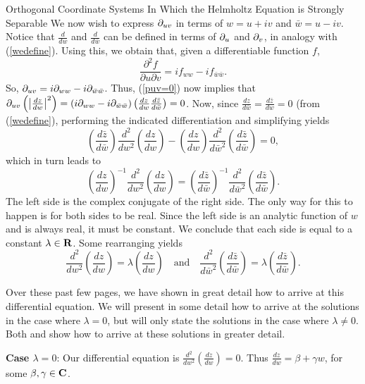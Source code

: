 \begin{section}{Orthogonal Coordinate Systems In Which the Helmholtz Equation is Strongly Separable}
We now wish to express $\partial_{u v}$ in terms of $w = u + iv$ and $\bar{w} = u - iv$.  Notice that $\frac{d}{d w}$ and $\frac{d}{d \bar{w}}$ can be defined in terms of $\partial_{u}$ and $\partial_{v}$, in analogy with (\ref{wedefine}).  Using this, we obtain that, given a differentiable function $f$,
\[
\frac{\partial^2 f}{\partial u \partial v} = i f_{ww} - i f_{\bar{w}\bar{w}}.
\]
So, $\partial_{u v} = i \partial_{w w} - i \partial_{\bar{w} \bar{w}}$.  Thus, (\ref{puv=0}) now implies that $\partial_{u v} \left( \left|\frac{d z}{d w}\right|^2 \right) = (i \partial_{w w} - i \partial_{\bar{w} \bar{w}}) \left( \frac{d z}{d w} \frac{d \bar{z}}{d \bar{w}} \right) = 0$.  Now, since $\frac{dz}{d \bar{w}} = \frac{d \bar{z}}{d w} = 0$ (from (\ref{wedefine}), performing the indicated differentiation and simplifying yields
\[
\left( \frac{d \bar{z}}{d \bar{w}} \right) 
\frac{d^2}{d w^2} 
\left( \frac{d z}{d w} \right) -
 \left( \frac{d z}{d w} \right) 
  \frac{d^2}{d \bar{w}^2} 
  \left( \frac{d \bar{z}}{d \bar{w}} \right)
  = 0,
\]
which in turn leads to
\[
\left( \frac{d z}{d w} \right)^{-1}
\frac{d^2}{d w^2}
\left( \frac{d z}{d w} \right)
= \left( \frac{d \bar{z}}{d \bar{w}} \right)^{-1}
  \frac{d^2}{d \bar{w}^2}
  \left( \frac{d \bar{z}}{d \bar{w}} \right).
\]
The left side is the complex conjugate of the right side.  The only way for this to happen is for both sides to be real.  Since the left side is an analytic function of $w$ and is always real, it must be constant.  We conclude that each side is equal to a constant $\lambda \in \mathbf{R}$.  Some rearranging yields
\begin{equation}
\label{sepdiffeqs}
\frac{d^2}{d w^2} \left( \frac{d z}{d w} \right) = \lambda \left( \frac{d z}{d w} \right)
\quad \mbox{and} \quad
\frac{d^2}{d \bar{w}^2} \left( \frac{d \bar{z}}{d \bar{w}} \right) = \lambda \left( \frac{d \bar{z}}{d \bar{w}} \right).
\end{equation}

Over these past few pages, we have shown in great detail how to arrive at this differential equation.  We will present in some detail how to arrive at the solutions in the case where $\lambda = 0$, but will only state the solutions in the case where $\lambda \not= 0$.  Both \cite{miller} and \cite{morse} show how to arrive at these solutions in greater detail.

\noindent \textbf{Case $\lambda = 0$}: Our differential equation is $\frac{d^2}{d w^2} (\frac{d z}{d w}) = 0$.  Thus $\frac{d z}{d w} = \beta + \gamma w$, for some $\beta, \gamma \in \mathbf{C}$.


\end{section}
